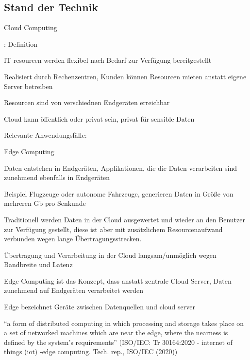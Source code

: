 \subsection*{Stand der Technik}
\begin{notes}
    \item Cloud Computing
    \begin{notes}
        \item: Definition
        \item IT resourcen werden flexibel nach Bedarf zur Verfügung bereitgestellt
        \item Realisiert durch Rechenzentren, Kunden können Resourcen mieten anstatt eigene Server betreiben
        \item Resourcen sind von verschiednen Endgeräten erreichbar \cite{Sunyaev2020}
        \item Cloud kann öffentlich oder privat sein, privat für sensible Daten \cite{Ibrahim2021}
        \item Relevante Anwendungsfälle:
    \end{notes}
    \item Edge Computing
    \begin{notes}
        \item Daten entstehen in Endgeräten, Applikationen, die die Daten verarbeiten sind zunehmend ebenfalls in Endgeräten
        \item Beispiel Flugzeuge oder autonome Fahrzeuge, generieren Daten in Größe von mehreren Gb pro Senkunde \cite{Liu2019}
        \item Traditionell werden Daten in der Cloud ausgewertet und wieder an den Benutzer zur Verfügung gestellt, diese ist aber mit zusätzlichem Resourcenaufwand verbunden wegen lange Übertragungsstrecken. \cite{Perez2022} 
        \item Übertragung und Verarbeitung in der Cloud langsam/unmöglich wegen Bandbreite und Latenz
        \item Edge Computing ist das Konzept, dass anstatt zentrale Cloud Server, Daten zunehmend auf Endgeräten verarbeitet werden \cite{Shi2016}
        \item Edge bezeichnet Geräte zwischen Datenquellen und cloud server
        \item “a form of distributed computing in which processing and storage takes place on a set of networked machines which are near the edge, where the nearness is defined by the system’s requirements”  (ISO/IEC: Tr 30164:2020 - internet of things (iot) -edge computing. Tech. rep., ISO/IEC (2020))

\end{notes}
\end{notes}
